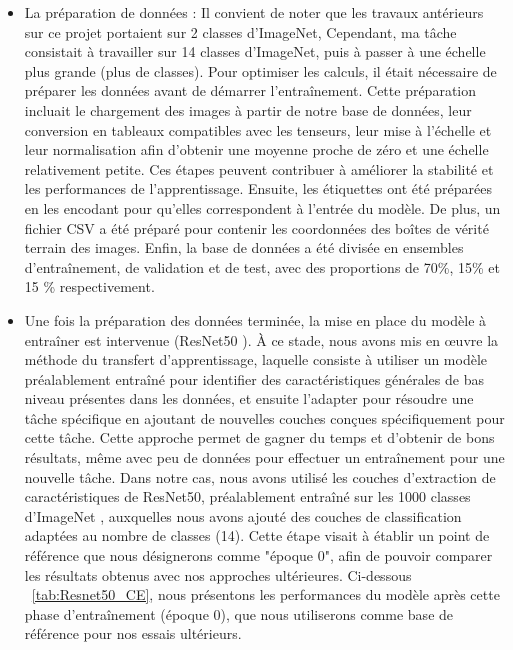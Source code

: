\documentclass{report}
\begin{document}
{            \begin{itemize}
            \item La préparation  de données : Il convient de noter que les travaux antérieurs sur ce projet portaient sur 2 classes d'ImageNet\cite{ILSVRC15}, Cependant, ma tâche consistait à travailler sur 14 classes d'ImageNet, puis à passer à une échelle plus grande (plus de classes). Pour optimiser les calculs, il était nécessaire de préparer les données avant de démarrer l'entraînement. Cette préparation incluait le chargement des images à partir de notre base de données, leur conversion en tableaux compatibles avec les tenseurs, leur mise à l'échelle et leur normalisation afin d'obtenir une moyenne proche de zéro et une échelle relativement petite. Ces étapes peuvent contribuer à améliorer la stabilité et les performances de l'apprentissage. Ensuite, les étiquettes ont été préparées en les encodant pour qu'elles correspondent à l'entrée du modèle. De plus, un fichier CSV a été préparé pour contenir les coordonnées des boîtes de vérité terrain des images. Enfin, la base de données a été divisée en ensembles d'entraînement, de validation et de test, avec des proportions de 70\%, 15\% et 15 \% respectivement.    
            \item Une fois la préparation des données terminée, la mise en place du modèle à entraîner est intervenue (ResNet50 \cite{he2016identity}). À ce stade, nous avons mis en œuvre la méthode du transfert d'apprentissage, laquelle consiste à utiliser un modèle préalablement entraîné pour identifier des caractéristiques générales de bas niveau présentes dans les données, et ensuite l'adapter pour résoudre une tâche spécifique en ajoutant de nouvelles couches conçues spécifiquement pour cette tâche. Cette approche permet de gagner du temps et d'obtenir de bons résultats, même avec peu de données pour effectuer un entraînement pour une nouvelle tâche. Dans notre cas, nous avons utilisé les couches d'extraction de caractéristiques de ResNet50, préalablement entraîné sur les 1000 classes d'ImageNet \cite{ILSVRC15}, auxquelles nous avons ajouté des couches de classification adaptées au nombre de classes (14).  Cette étape visait à établir un point de référence que nous désignerons comme "époque 0", afin de pouvoir comparer les résultats obtenus avec nos approches ultérieures. Ci-dessous ~\ref{tab:Resnet50_CE}, nous présentons les performances du modèle après cette phase d'entraînement (époque 0), que nous utiliserons comme base de référence pour nos essais ultérieurs.
            

\end{itemize}}
\end{document}
